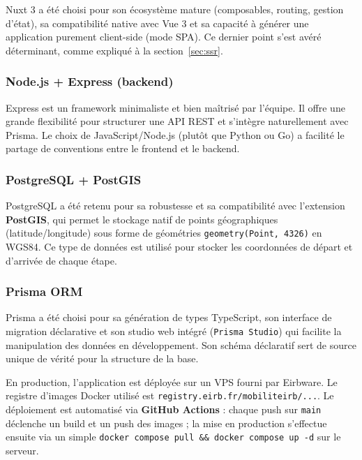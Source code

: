 \documentclass[11pt,a4paper]{article}
\begin{document}
Nuxt 3 a été choisi pour son écosystème mature (composables, routing, gestion d'état), sa compatibilité native avec Vue 3 et sa capacité à générer une application purement client-side (mode SPA). Ce dernier point s'est avéré déterminant, comme expliqué à la section~\ref{sec:ssr}.

\subsubsection*{Node.js + Express (backend)}

Express est un framework minimaliste et bien maîtrisé par l'équipe. Il offre une grande flexibilité pour structurer une API REST et s'intègre naturellement avec Prisma. Le choix de JavaScript/Node.js (plutôt que Python ou Go) a facilité le partage de conventions entre le frontend et le backend.

\subsubsection*{PostgreSQL + PostGIS}

PostgreSQL a été retenu pour sa robustesse et sa compatibilité avec l'extension \textbf{PostGIS}, qui permet le stockage natif de points géographiques (latitude/longitude) sous forme de géométries \texttt{geometry(Point, 4326)} en WGS84. Ce type de données est utilisé pour stocker les coordonnées de départ et d'arrivée de chaque étape.

\subsubsection*{Prisma ORM}

Prisma a été choisi pour sa génération de types TypeScript, son interface de migration déclarative et son studio web intégré (\texttt{Prisma Studio}) qui facilite la manipulation des données en développement. Son schéma déclaratif sert de source unique de vérité pour la structure de la base.

\begin{infobox}[title={Infrastructure de production}]
En production, l'application est déployée sur un VPS fourni par Eirbware. Le registre d'images Docker utilisé est \texttt{registry.eirb.fr/mobiliteirb/...}. Le déploiement est automatisé via \textbf{GitHub Actions} : chaque push sur \texttt{main} déclenche un build et un push des images ; la mise en production s'effectue ensuite via un simple \texttt{docker compose pull \&\& docker compose up -d} sur le serveur.
\end{infobox}
\end{document}
